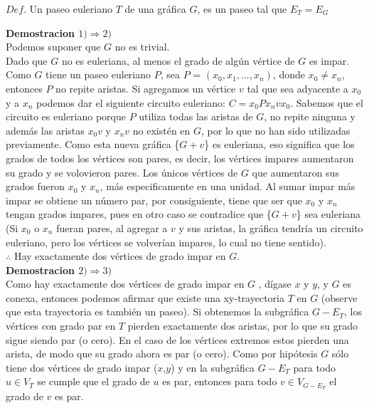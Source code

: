 \documentclass[12pt]{article}
\begin{document}
\begin{tcolorbox}[title=\textbf{Definiciones}, colback=blue!15!white, colframe=black!]
     $Def$. Un paseo euleriano $T$ de una gráfica $G$, es un paseo tal que $E_T = E_G$ 
\end{tcolorbox}



\textbf{Demostracion $1) \Rightarrow 2)$}\\

Podemos suponer que $G$ no es trivial.\\

Dado que $G$ no es euleriana, al menos el grado de algún vértice de $G$ es impar. Como $G$ tiene un paseo euleriano $P$, sea $P$ = $(x_0,x_1,...,x_n)$, donde $x_0 \neq x_n$, entonces $P$ no repite aristas. Si agregamos un vértice $v$ tal que sea adyacente a $x_0$ y a $x_n$ podemos dar el siguiente circuito euleriano: $C = x_0Px_nvx_0$. Sabemos que el circuito es euleriano porque $P$ utiliza todas las aristas de $G$, no repite ninguna y además las aristas $x_0v$ y $x_nv$ no existén en $G$, por lo que no han sido utilizadas previamente. Como esta nueva gráfica  \{$G + v$\} es euleriana, eso significa que los grados de todos los vértices son pares, es decir, los vértices impares aumentaron su grado y se volovieron pares. Los únicos vértices de $G$ que aumentaron sus grados fueron $x_0$ y $x_n$, más especificamente en una unidad. Al sumar impar más impar se obtiene un número par, por consiguiente, tiene que ser que $x_0$ y $x_n$ tengan grados impares, pues en otro caso se contradice que \{$G + v$\} sea euleriana (Si $x_0$ o $x_n$ fueran pares, al agregar a $v$ y sus aristas, la gráfica tendría un circuito euleriano, pero los vértices se volverían impares, lo cual no tiene sentido).\\

$\therefore$ Hay exactamente dos vértices de grado impar en $G$.\\

\textbf{Demostracion $2) \Rightarrow 3)$}\\

Como hay exactamente dos vértices de grado impar en $G$ , dígase $x$ y $y$, y $G$ es conexa, entonces podemos afirmar que existe una xy-trayectoria $T$ en $G$ (observe que esta trayectoria es también un paseo). Si obtenemos la subgráfica $G - E_T$, los vértices con grado par en $T$ pierden exactamente dos aristas, por lo que su grado sigue siendo par (o cero). En el caso de los vértices extremos  estos pierden una arista, de modo que su grado ahora es par (o cero). Como por hipótesis $G$ sólo tiene dos vértices de grado impar ($x$,$y$) y en la subgráfica $G - E_T$ para todo $u \in V_T$ se cumple que el grado de $u$ es par, entonces para todo $v \in V_{G - E_T}$ el grado de $v$ es par.\\
\end{document}
